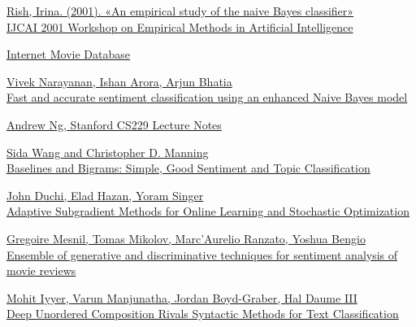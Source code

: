\begin{thebibliography}{00}

\href{https://www.researchgate.net/publication/228845263_An_Empirical_Study_of_the_Naive_Bayes_Classifier}
{Rish, Irina. (2001). «An empirical study of the naive Bayes classifier» \\ IJCAI 2001 Workshop on Empirical Methods in Artificial Intelligence}

\href{http://ai.stanford.edu/~amaas/data/sentiment/}{Internet Movie Database}

\href{https://pdfs.semanticscholar.org/c7a6/53d57e7f6686a13a37463f5e04e2916a5170.pdf}{Vivek Narayanan, Ishan Arora, Arjun Bhatia \\
Fast and accurate sentiment classification using an
enhanced Naive Bayes model}

\href{http://see.stanford.edu/materials/aimlcs229/cs229-notes1.pdf}{Andrew Ng, Stanford CS229 Lecture Notes}

\href{https://www.aclweb.org/anthology/P12-2018}{Sida Wang and Christopher D. Manning \\ Baselines and Bigrams: Simple, Good Sentiment and Topic Classification}

\href{http://stanford.edu/~jduchi/projects/DuchiHaSi10_colt.pdf}{John Duchi, Elad Hazan, Yoram Singer \\
Adaptive Subgradient Methods for
Online Learning and Stochastic Optimization}

\href{https://arxiv.org/pdf/1412.5335.pdf}{Gregoire Mesnil, Tomas Mikolov, Marc’Aurelio Ranzato, Yoshua Bengio \\
Ensemble of generative and
discriminative techniques for sentiment analysis of movie reviews}

\href{http://www.aclweb.org/anthology/P15-1162}{Mohit Iyyer,  Varun Manjunatha, Jordan Boyd-Graber, Hal Daume III \\
Deep Unordered Composition Rivals Syntactic Methods
for Text Classification}
\end{thebibliography}